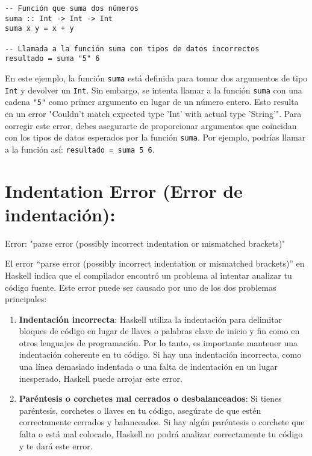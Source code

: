 \documentclass{article}
\begin{document}
\begin{verbatim}
-- Función que suma dos números
suma :: Int -> Int -> Int
suma x y = x + y

-- Llamada a la función suma con tipos de datos incorrectos
resultado = suma "5" 6
\end{verbatim}

En este ejemplo, la función \texttt{suma} está definida para tomar dos argumentos de tipo \texttt{Int} y devolver un \texttt{Int}. Sin embargo, se intenta llamar a la función \texttt{suma} con una cadena \texttt{"5"} como primer argumento en lugar de un número entero. Esto resulta en un error "Couldn't match expected type 'Int' with actual type 'String'". Para corregir este error, debes asegurarte de proporcionar argumentos que coincidan con los tipos de datos esperados por la función \texttt{suma}. Por ejemplo, podrías llamar a la función así: \texttt{resultado = suma 5 6}.

\newpage
\section{Indentation Error (Error de indentación):}

\begin{mdframed}[backgroundcolor=red!40,shadow=true,shadowsize=2pt,roundcorner=2pt]
    Error: "parse error (possibly incorrect indentation or mismatched brackets)"
\end{mdframed}

El error ``parse error (possibly incorrect indentation or mismatched brackets)'' en Haskell indica que el compilador encontró un problema al intentar analizar tu código fuente. Este error puede ser causado por uno de los dos problemas principales:

\begin{enumerate}
    \item \textbf{Indentación incorrecta}: Haskell utiliza la indentación para delimitar bloques de código en lugar de llaves o palabras clave de inicio y fin como en otros lenguajes de programación. Por lo tanto, es importante mantener una indentación coherente en tu código. Si hay una indentación incorrecta, como una línea demasiado indentada o una falta de indentación en un lugar inesperado, Haskell puede arrojar este error.
    
    \item \textbf{Paréntesis o corchetes mal cerrados o desbalanceados}: Si tienes paréntesis, corchetes o llaves en tu código, asegúrate de que estén correctamente cerrados y balanceados. Si hay algún paréntesis o corchete que falta o está mal colocado, Haskell no podrá analizar correctamente tu código y te dará este error.
\end{enumerate}
\end{document}
